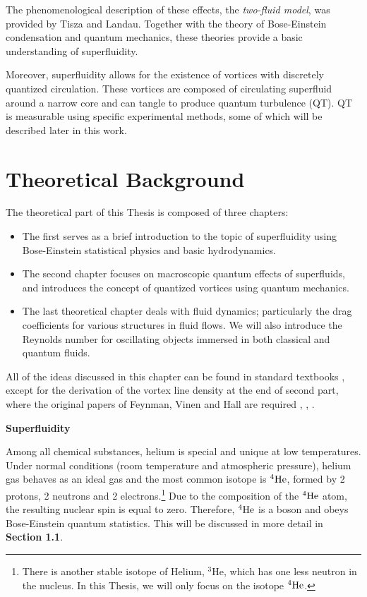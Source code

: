 The phenomenological description of these effects, the \textit{two-fluid model}, was provided by Tisza and Landau. Together with the theory of Bose-Einstein condensation and quantum mechanics, these theories provide a basic understanding of superfluidity.

Moreover, superfluidity allows for the existence of vortices with discretely quantized circulation. These vortices are composed of circulating superfluid around a narrow core and can tangle to produce quantum turbulence (QT). QT is measurable using specific experimental methods, some of which will be described later in this work.




\newpage
\chapter{Theoretical Background}

The theoretical part of this Thesis is composed of three chapters:

\begin{itemize}
	\item[1.] The first serves as a brief introduction to the topic of superfluidity using  Bose-Einstein statistical physics and basic hydrodynamics.

	\item[2.] The second chapter focuses on macroscopic quantum effects of superfluids, and introduces the concept of quantized vortices using quantum mechanics.

	\item[3.] The last theoretical chapter deals with fluid dynamics; particularly the drag coefficients for various structures in fluid flows. We will also introduce the Reynolds number for oscillating objects immersed in both classical and quantum fluids.
\end{itemize}
All of the ideas discussed in this chapter can be found in standard textbooks \cite{skrbek}, \cite{landau} except for the derivation of the vortex line density at the end of second part, where the original papers of Feynman, Vinen and Hall are required \cite{feynman}, \cite{vinen1}, \cite{vinen2}.

\vspace{1cm}
{\Huge \bfseries Superfluidity}
\vspace{0.3cm}


Among all chemical substances, helium is special and unique at low temperatures. Under normal conditions (room temperature and atmospheric pressure), helium gas behaves as an ideal gas and the most common isotope is ${}^4\mathrm{He}$, formed by 2 protons, 2 neutrons and 2 electrons.\footnote{There is another stable isotope of Helium, ${}^3\mathrm{He}$, which has one less neutron in the nucleus. In this Thesis, we will only focus on the isotope ${}^4\mathrm{He}$.} Due to the composition of the ${}^4\mathrm{He}$ atom, the resulting nuclear spin is equal to zero. Therefore, ${}^4\mathrm{He}$  is a boson and obeys Bose-Einstein quantum statistics. This will be discussed in more detail in {\sffamily\textbf{Section 1.1}}.

